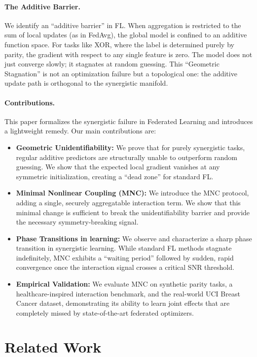 \documentclass{article}
\theoremstyle{plain}
\theoremstyle{definition}
\begin{document}
\paragraph{The Additive Barrier.} We identify an ``additive barrier'' in FL. When aggregation is restricted to the sum of local updates (as in FedAvg), the global model is confined to an additive function space. For tasks like XOR, where the label is determined purely by parity, the gradient with respect to any single feature is zero. The model does not just converge slowly; it stagnates at random guessing. This ``Geometric Stagnation'' is not an optimization failure but a topological one: the additive update path is orthogonal to the synergistic manifold.

\paragraph{Contributions.}
This paper formalizes the synergistic failure in Federated Learning and introduces a lightweight remedy. Our main contributions are:
\begin{itemize}
    \item \textbf{Geometric Unidentifiability:} We prove that for purely synergistic tasks, regular additive predictors are structurally unable to outperform random guessing. We show that the expected local gradient vanishes at any symmetric initialization, creating a ``dead zone'' for standard FL.
    \item \textbf{Minimal Nonlinear Coupling (MNC):} We introduce the MNC protocol, adding a single, securely aggregatable interaction term. We show that this minimal change is sufficient to break the unidentifiability barrier and provide the necessary symmetry-breaking signal.
    \item \textbf{Phase Transitions in learning:} We observe and characterize a sharp phase transition in synergistic learning. While standard FL methods stagnate indefinitely, MNC exhibits a ``waiting period'' followed by sudden, rapid convergence once the interaction signal crosses a critical SNR threshold.
    \item \textbf{Empirical Validation:} We evaluate MNC on synthetic parity tasks, a healthcare-inspired interaction benchmark, and the real-world UCI Breast Cancer dataset, demonstrating its ability to learn joint effects that are completely missed by state-of-the-art federated optimizers.
\end{itemize}

\section{Related Work}
\label{sec:related}
\end{document}
